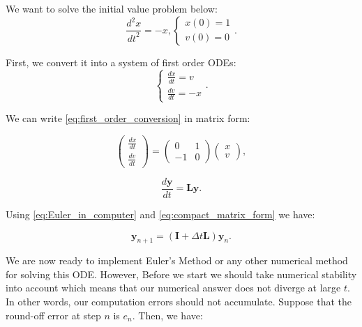 \documentclass[11pt]{article}
\begin{document}
    We want to solve the initial value problem below:
\begin{equation}\label{eq:initial_value_problem}
    \frac{d^2 x}{{dt}^2} = -x,
    \left\{
        \begin{array}{l}
            x(0) = 1 \\
            v(0) = 0
        \end{array}
     \right..
\end{equation}

First, we convert it into a system of first order ODEs:
\begin{equation}\label{eq:first_order_conversion}
    \left\{
        \begin{array}{l}
            \frac{dx}{dt} = v \\
            \frac{dv}{dt} = -x
        \end{array}
    \right..
\end{equation}

We can write \ref{eq:first_order_conversion} in matrix form:

\begin{equation}\label{eq:matrix_form}
    \begin{pmatrix}
        \frac{dx}{dt} \\
        \frac{dv}{dt}
    \end{pmatrix}
    =
    \begin{pmatrix}
        0 & 1 \\
        -1 & 0
    \end{pmatrix}
    \begin{pmatrix}
        x \\
        v
    \end{pmatrix},
\end{equation}

\begin{equation}\label{eq:compact_matrix_form}
    \frac{d\mathbf{y}}{dt} = \mathbf{L}\mathbf{y}.
\end{equation}

Using \ref{eq:Euler_in_computer} and \ref{eq:compact_matrix_form} we
have:

\begin{equation}\label{eq:Euler_matrix_form}
    {\mathbf{y}}_{n + 1} = (\mathbf{I} + \Delta t\mathbf{L}){\mathbf{y}}_n.
\end{equation}

We are now ready to implement Euler's Method or any other numerical
method for solving this ODE. However, Before we start we should take
numerical stability into account which means that our numerical answer
does not diverge at large \(t\). In other words, our computation errors
should not accumulate. Suppose that the round-off error at step \(n\) is
\(e_{n}\). Then, we have:
\end{document}
